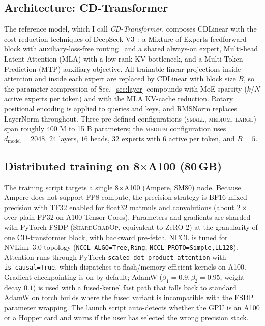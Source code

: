 \documentclass[aps,prx,onecolumn,11pt,nofootinbib,longbibliography]{revtex4-2}
\begin{document}
\subsection{Architecture: CD-Transformer}

The reference model, which I call \emph{CD-Transformer}, composes CDLinear
with the cost-reduction techniques of DeepSeek-V3~\cite{DeepSeekV3}: a
Mixture-of-Experts feedforward block with auxiliary-loss-free
routing~\cite{Wang2024aux} and a shared always-on expert, Multi-head
Latent Attention (MLA) with a low-rank KV bottleneck, and a
Multi-Token Prediction (MTP) auxiliary objective.  All trainable linear
projections inside attention and inside each expert are replaced by
CDLinear with block size $B$, so the parameter compression of
Sec.~\ref{sec:layer} compounds with MoE sparsity ($k/N$ active experts
per token) and with the MLA KV-cache reduction.  Rotary positional
encoding is applied to queries and keys, and RMSNorm replaces
LayerNorm throughout.  Three pre-defined configurations
(\textsc{small}, \textsc{medium}, \textsc{large}) span roughly 400 M
to 15 B parameters; the \textsc{medium} configuration uses
$d_\textrm{model}{=}2048$, $24$ layers, $16$ heads, $32$ experts with
$6$ active per token, and $B=5$.

\subsection{Distributed training on 8$\times$A100 (80\,GB)}

The training script targets a single 8$\times$A100 (Ampere, SM80) node.
Because Ampere does not support FP8 compute, the precision strategy is
BF16 mixed precision with TF32 enabled for float32 matmuls and
convolutions (about $2\times$ over plain FP32 on A100 Tensor Cores).
Parameters and gradients are sharded with PyTorch FSDP
(\textsc{ShardGradOp}, equivalent to ZeRO-2) at the granularity of one
CD-transformer block, with backward pre-fetch.  NCCL is tuned for
NVLink~3.0 topology (\texttt{NCCL\_ALGO=Tree,Ring},
\texttt{NCCL\_PROTO=Simple,LL128}).  Attention runs through PyTorch
\texttt{scaled\_dot\_product\_attention} with \texttt{is\_causal=True},
which dispatches to flash/memory-efficient kernels on A100.  Gradient
checkpointing is on by default; AdamW
($\beta_1{=}0.9, \beta_2{=}0.95$, weight decay $0.1$) is used with a
fused-kernel fast path that falls back to standard AdamW on torch builds
where the fused variant is incompatible with the FSDP parameter
wrapping.  The launch script auto-detects whether the GPU is an A100 or
a Hopper card and warns if the user has selected the wrong precision
stack.
\end{document}
